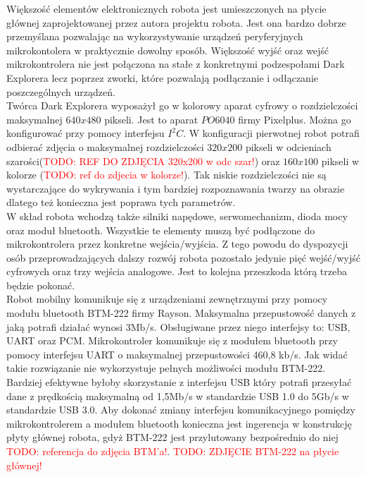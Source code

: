 Większość elementów elektronicznych robota jest umieszczonych na płycie głównej zaprojektowanej przez autora projektu robota. Jest ona bardzo dobrze przemyślana pozwalając na wykorzystywanie urządzeń peryferyjnych mikrokontolera w praktycznie dowolny sposób. Większość wyjść oraz wejść mikrokontrolera nie jest połączona na stałe z konkretnymi podzespołami Dark Explorera lecz poprzez zworki, które pozwalają podłączanie i odłączanie poszczególnych urządzeń.
\\

Twórca Dark Explorera wyposażył go w kolorowy aparat cyfrowy o rozdzielczości maksymalnej $640x480$ pikseli. Jest to aparat $PO6040$ firmy Pixelplus. Można go konfigurować przy pomocy interfejsu $I^{2}C$. W konfiguracji pierwotnej robot potrafi odbierać zdjęcia o maksymalnej rozdzielczości $320x200$ pikseli w odcieniach szarości(\textcolor{red}{TODO: REF DO ZDJĘCIA 320x200 w odc szar!}) oraz $160x100$ pikseli w kolorze (\textcolor{red}{TODO: ref do zdjecia w kolorze!}). Tak niskie rozdzielczości nie są wystarczające do wykrywania i tym bardziej rozpoznawania twarzy na obrazie dlatego też konieczna jest poprawa tych parametrów.
\\

W skład robota wchodzą także silniki napędowe, serwomechanizm, dioda mocy oraz moduł bluetooth. Wszystkie te elementy muszą być podłączone do mikrokontrolera przez konkretne wejścia/wyjścia. Z tego powodu do dyspozycji osób przeprowadzających dalszy rozwój robota pozostało jedynie pięć wejść/wyjść cyfrowych oraz trzy wejścia analogowe. Jest to kolejna przeszkoda którą trzeba będzie pokonać.
\\

Robot mobilny komunikuje się z urządzeniami zewnętrznymi przy pomocy modułu bluetooth BTM-222 firmy Rayson. Maksymalna przepustowość danych z jaką potrafi działać wynosi 3Mb/s. Obsługiwane przez niego interfejsy to: USB, UART oraz PCM. Mikrokontroler komunikuje się z modułem bluetooth przy pomocy interfejsu UART o maksymalnej przepustowości 460,8 kb/s. Jak widać takie rozwiązanie nie wykorzystuje pełnych możliwości modułu BTM-222. Bardziej efektywne byłoby skorzystanie z interfejsu USB który potrafi przesyłać dane z prędkością maksymalną od 1,5Mb/s w standardzie USB 1.0 do 5Gb/s w standardzie USB 3.0. Aby dokonać zmiany interfejsu komunikacyjnego pomiędzy mikrokontrolerem a modułem bluetooth konieczna jest ingerencja w konstrukcję płyty głównej robota, gdyż BTM-222 jest przylutowany bezpośrednio do niej \textcolor{red}{TODO: referencja do zdjęcia BTM'a!}.
\textcolor{red}{TODO: ZDJĘCIE BTM-222 na płycie głównej!}

